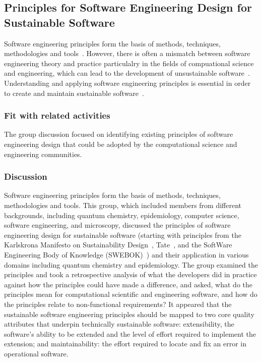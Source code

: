 \subsection{Principles for Software Engineering Design for Sustainable Software} 


Software engineering principles form the basis of methods, techniques, methodologies and tools~\cite{Vliet:2008}. However, there is often a mismatch between software engineering theory and practice particulalry in the fields of compuational science and engineering, which can lead to the development of unsustainable software~\cite{Merali:2010,hettrick:2014}. Understanding and applying software engineering principles is essential in order to create and maintain sustainable software~\cite{Becker:2016}.

\subsubsection{Fit with related activities}
The group discussion focused on identifying existing principles of software engineering design that could be adopted by the computational science and engineering communities.

\subsubsection{Discussion}

Software engineering principles form the basis of methods, techniques, methodologies and tools. This group, which included members from different backgrounds, including quantum chemistry, epidemiology, computer science, software engineering, and microscopy, discussed the principles of software engineering design for sustainable software (starting with principles from the Karlskrona Manifesto on Sustainability Design~\cite{Becker:2014}, Tate~\cite{tate:2005}, and the SoftWare Engineering Body of Knowledge (SWEBOK)~\cite{swebokv3}) and their application in various domains including quantum chemistry and epidemiology.  The group examined the principles and took a retrospective analysis of what the developers did in practice against how the principles could have made a difference, and asked, what do the principles mean for  computational scientific and engineering software, and how do the principles relate to non-functional requirements? It
appeared that the sustainable software engineering principles should be mapped to two core quality attributes that underpin technically sustainable software: extensibility, the software's ability to be extended and the level of effort required to implement the extension; and
maintainability: the effort required to locate and fix an error in operational software.

